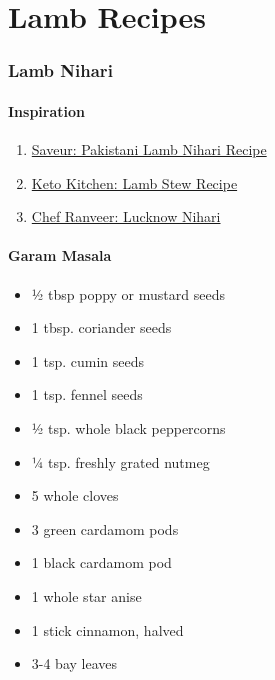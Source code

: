 \documentclass[]{article}
\providecommand{\tightlist}{%
  \setlength{\itemsep}{0pt}\setlength{\parskip}{0pt}}
\begin{document}
\hypertarget{part-lamb-recipes}{%
\part{Lamb Recipes}\label{part-lamb-recipes}}

\hypertarget{lamb-nihari}{%
\section{Lamb Nihari}\label{lamb-nihari}}

\hypertarget{inspiration}{%
\subsection{Inspiration}\label{inspiration}}

\begin{enumerate}
\def\labelenumi{\arabic{enumi}.}
\tightlist
\item
  \href{https://www.saveur.com/article/recipes/pakistani-slow-cooked-lamb-stew-dumbay-ki-nihari/}{Saveur: Pakistani Lamb Nihari Recipe}
\item
  \href{https://www.myketokitchen.com/keto-recipes/lamb-stew-pressure-cooker/}{Keto Kitchen: Lamb Stew Recipe}
\item
  \href{https://www.youtube.com/watch?v=axon9qBTmXc\&ab_channel=ChefRanveer}{Chef Ranveer: Lucknow Nihari}
\end{enumerate}

\hypertarget{garam-masala}{%
\subsection{Garam Masala}\label{garam-masala}}

\begin{itemize}
\tightlist
\item
  1⁄2 tbsp poppy or mustard seeds
\item
  1 tbsp. coriander seeds
\item
  1 tsp. cumin seeds
\item
  1 tsp. fennel seeds
\item
  1⁄2 tsp. whole black peppercorns
\item
  1⁄4 tsp. freshly grated nutmeg
\item
  5 whole cloves
\item
  3 green cardamom pods
\item
  1 black cardamom pod
\item
  1 whole star anise
\item
  1 stick cinnamon, halved
\item
  3-4 bay leaves
\end{itemize}
\end{document}
